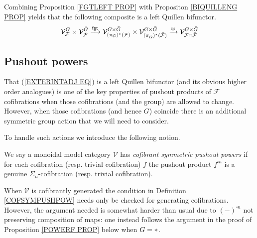 \documentclass[a4paper,10pt]{article}%
\begin{document}
\begin{remark}
	Combining Proposition \ref{FGTLEFT PROP} 
	with Propositon \ref{BIQUILLENG PROP} yields that
	the following composite is a left Quillen bifunctor.
\begin{equation}\label{EXTERINTADJ EQ}
	\mathcal{V}^{G}_{\mathcal{F}}
		\times
	\mathcal{V}^{\bar{G}}_{\bar{\mathcal{F}}}
		\xrightarrow{\mathsf{fgt}}
	\mathcal{V}^{G \times \bar{G}}_{
	(\pi_G)^{\**}(\mathcal{F})}
		\times
	\mathcal{V}^{G \times \bar{G}}_{
	(\pi_{\bar{G}})^{\**}(\bar{\mathcal{F}})}
		\xrightarrow{\otimes}
	\mathcal{V}^{G \times \bar{G}}_{
	\mathcal{F} \sqcap \bar{\mathcal{F}}}
\end{equation}
\end{remark}


\subsection{Pushout powers}


That (\ref{EXTERINTADJ EQ}) is a left Quillen bifunctor (and its obvious higher order analogues) is one of the key properties of pushout products of $\mathcal{F}$ cofibrations when those cofibrations (and the group) are allowed to change. However, when those cofibrations (and hence $G$) coincide there is an additional symmetric group action that  we will need to consider.

To handle such actions we introduce the following notion.

\begin{definition}\label{COFSYMPUSHPOW}
	We say a monoidal model category $\mathcal{V}$ has 
	\textit{cofibrant symmetric pushout powers}
	if for each cofibration (resp. trivial cofibration) $f$ the pushout product 
	$f^{\square n}$ is a genuine $\Sigma_n$-cofibration (resp. trivial cofibration).
\end{definition}


\begin{remark}
When $\mathcal{V}$ is cofibrantly generated
the condition in Definition \ref{COFSYMPUSHPOW} needs only be checked for generating cofibrations. 
However, the argument needed is somewhat harder than usual due to $(-)^{\square n}$ not preserving composition of maps:
one instead follows the argument in the proof of 
Proposition \ref{POWERF PROP} below when $G=\**$.
\end{remark}


\end{document}
